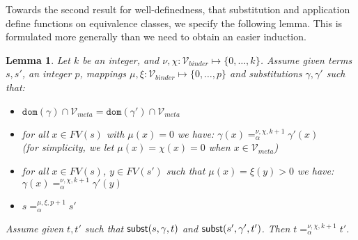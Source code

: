 \documentclass{lmcs}
\theoremstyle{theorem}\newtheorem{theorem}{Theorem}
\theoremstyle{theorem}\newtheorem{lemma}[theorem]{Lemma}
\theoremstyle{theorem}\newtheorem{corollary}[theorem]{Corollary}
\theoremstyle{definition}\newtheorem{definition}[theorem]{Definition}
\theoremstyle{definition}\newtheorem{example}[theorem]{Example}
\newcommand{\Vmeta}{\mathcal{V}_{\mathit{meta}}}
\newcommand{\Vbound}{\mathcal{V}_{\mathit{binder}}}
\newcommand{\FV}{\mathit{FV}}
\newcommand{\domain}{\mathtt{dom}}
\newcommand{\avar}{x}
\begin{document}
Towards the second result for well-definedness, that substitution and application define functions
on equivalence classes, we specify the following lemma.  This is formulated more generally than we
need to obtain an easier induction.

\begin{lemma}\label{lem:substitutionalpha}
Let $k$ be an integer, and $\nu,\chi : \Vbound \mapsto \{0,\dots,k\}$.
Assume given terms $s,s'$, an integer $p$, mappings $\mu,\xi : \Vbound \mapsto \{0,\dots,p\}$ and substitutions $\gamma,\gamma'$ such that:
\begin{itemize}
\item $\domain(\gamma) \cap \Vmeta = \domain(\gamma') \cap \Vmeta$
\item for all $x \in \FV(s)$ with $\mu(x) = 0$ we have:
  $\gamma(x) =_\alpha^{\nu,\chi,k+1} \gamma'(x)$ \\
  (for simplicity, we let $\mu(\avar) = \chi(\avar) = 0$ when $\avar \in \Vmeta$)
\item for all $x \in \FV(s)$, $y \in \FV(s')$ such that $\mu(x) = \xi(y) > 0$ we have:
  $\gamma(x) =_\alpha^{\nu,\chi,k+1} \gamma'(y)$
\item $s =_\alpha^{\mu,\xi,p+1} s'$
\end{itemize}
Assume given $t,t'$ such that $\mathsf{subst}(s,\gamma,t)$ and $\mathsf{subst}(s',\gamma',t')$.  Then $t =_\alpha^{\nu,\chi,k+1} t'$.
\end{lemma}
\end{document}
